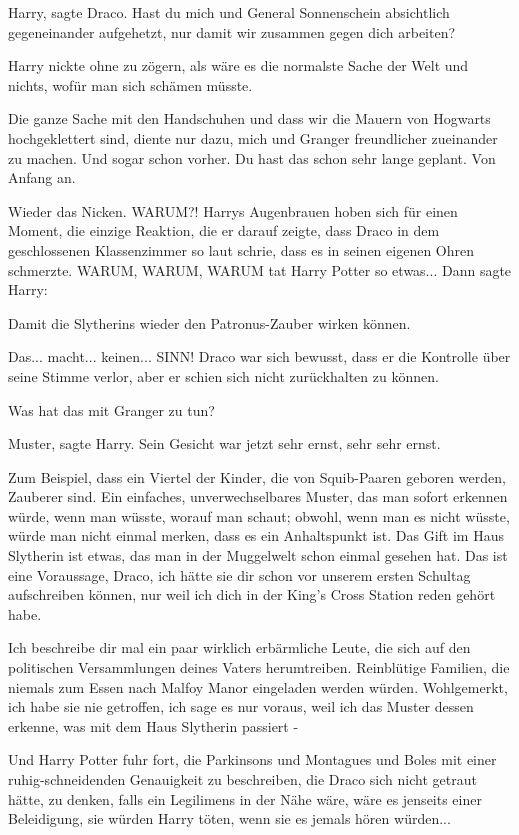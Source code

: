 \glqq{}Harry\grqq{}, sagte Draco. \glqq{}Hast du mich und General Sonnenschein
absichtlich gegeneinander aufgehetzt, nur damit wir zusammen gegen dich
arbeiten?\grqq{}

Harry nickte ohne zu zögern, als wäre es die normalste Sache der Welt und
nichts, wofür man sich schämen müsste.

\glqq{}Die ganze Sache mit den Handschuhen und dass wir die Mauern von Hogwarts
hochgeklettert sind, diente nur dazu, mich und Granger freundlicher zueinander
zu machen. Und sogar schon vorher. Du hast das schon sehr lange geplant. Von
Anfang an.\grqq{}

Wieder das Nicken. \glqq{}WARUM?!\grqq{} Harrys Augenbrauen hoben sich für einen
Moment, die einzige Reaktion, die er darauf zeigte, dass Draco in dem
geschlossenen Klassenzimmer so laut schrie, dass es in seinen eigenen Ohren
schmerzte. WARUM, WARUM, WARUM tat Harry Potter so etwas... Dann sagte Harry:

\glqq{}Damit die Slytherins wieder den Patronus-Zauber wirken können.\grqq{}

\glqq{}Das... macht... keinen... SINN!\grqq{} Draco war sich bewusst, dass er die
Kontrolle über seine Stimme verlor, aber er schien sich nicht zurückhalten zu
können.

\glqq{}Was hat das mit Granger zu tun?\grqq{}

\glqq{}Muster\grqq{}, sagte Harry. Sein Gesicht war jetzt sehr ernst, sehr sehr
ernst.

\glqq{}Zum Beispiel, dass ein Viertel der Kinder, die von Squib-Paaren geboren
werden, Zauberer sind. Ein einfaches, unverwechselbares Muster, das man sofort
erkennen würde, wenn man wüsste, worauf man schaut; obwohl, wenn man es nicht
wüsste, würde man nicht einmal merken, dass es ein Anhaltspunkt ist. Das Gift im
Haus Slytherin ist etwas, das man in der Muggelwelt schon einmal gesehen hat.
Das ist eine Voraussage, Draco, ich hätte sie dir schon vor unserem ersten
Schultag aufschreiben können, nur weil ich dich in der King's Cross Station
reden gehört habe.

Ich beschreibe dir mal ein paar wirklich erbärmliche Leute, die sich auf den
politischen Versammlungen deines Vaters herumtreiben. Reinblütige Familien, die
niemals zum Essen nach Malfoy Manor eingeladen werden würden. Wohlgemerkt, ich
habe sie nie getroffen, ich sage es nur voraus, weil ich das Muster dessen
erkenne, was mit dem Haus Slytherin passiert -\grqq{}

Und Harry Potter fuhr fort, die Parkinsons und Montagues und Boles mit einer
ruhig-schneidenden Genauigkeit zu beschreiben, die Draco sich nicht getraut
hätte, zu denken, falls ein Legilimens in der Nähe wäre, wäre es jenseits einer
Beleidigung, sie würden Harry töten, wenn sie es jemals hören würden...

